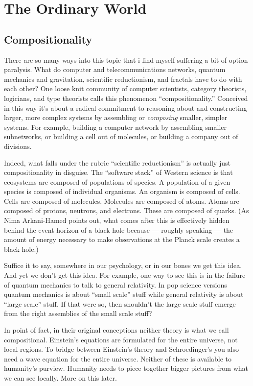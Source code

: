 \chapter{The Ordinary World}
\label{chap:pledge-ch1}

\section{Compositionality}
\label{sec:pledge-i}

There are so many ways into this topic that i find myself suffering a bit of option paralysis. What do computer and telecommunications networks, quantum mechanics and gravitation, scientific reductionism, and fractals have to do with each other? One loose knit community of computer scientists, category theorists, logicians, and type theorists  calls this phenomenon ``compositionality.'' Conceived in this way it's about a radical commitment to reasoning about and constructing larger, more complex systems by assembling or \emph{composing} smaller, simpler systems. For example, building a computer network by assembling smaller subnetworks, or building a cell out of molecules, or building a company out of divisions.

Indeed, what falls under the rubric ``scientific reductionism'' is actually just compositionality in disguise. The ``software stack'' of Western science is that ecosystems are composed of populations of species. A population of a given species is composed of individual organisms. An organism is composed of cells. Cells are composed of molecules. Molecules are composed of atoms. Atoms are composed of protons, neutrons, and electrons. These are composed of quarks. (As Nima Arkani-Hamed points out, what comes after this is effectively hidden behind the event horizon of a black hole because --- roughly speaking --- the amount of energy necessary to make observations at the Planck scale creates a black hole.)

Suffice it to say, somewhere in our psychology, or in our bones we get this idea. And yet we don't get this idea. For example, one way to see this is in the failure of quantum mechanics to talk to general relativity. In pop science versions quantum mechanics is about ``small scale'' stuff while general relativity is about ``large scale'' stuff. If that were so, then shouldn't the large scale stuff emerge from the right assemblies of the small scale stuff? 

In point of fact, in their original conceptions neither theory is what we call compositional. Einstein's equations are formulated for the entire universe, not local regions. To bridge between Einstein's theory and Schroedinger's you also need a wave equation for the entire universe.  Neither of these is available to humanity's purview. Humanity needs to piece together bigger pictures from what we can see locally. More on this later.

